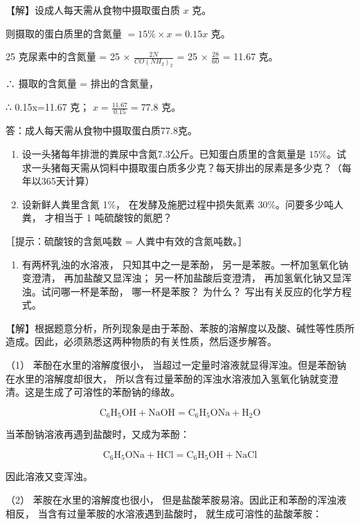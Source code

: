 【解】设成人每天需从食物中摄取蛋白质 \(x\) 克。

则摄取的蛋白质里的含氮量 \(= 15\% \times x = 0.15x\) 克。

25 克尿素中的含氮量 = 25 × \(\frac{2N}{CO(NH_{2})_{2}}\) = 25 ×
\(\frac{28}{60}\) = 11.67 克。

∴ 摄取的含氮量 = 排出的含氮量，

∴ 0.15x=11.67 克； \(x=\frac{11.67}{0.15}=77.8\) 克。

答：成人每天需从食物中摄取蛋白质77.8克。

\begin{enumerate}[start=5]
\item
  设一头猪每年排泄的粪尿中含氮7.3公斤。已知蛋白质里的含氮量是
  \(15\%\)。试求一头猪每天需从饲料中摄取蛋白质多少克？每天排出的尿素是多少克？（每年以365天计算）
\item
  设新鲜人粪里含氮 1\%， 在发酵及施肥过程中损失氮素
  30\%。问要多少吨人粪， 才相当于 1 吨硫酸铵的氮肥？
\end{enumerate}

［提示：硫酸铵的含氮吨数 = 人粪中有效的含氮吨数。］

\begin{enumerate}[start=7]
\item
  有两杯乳浊的水溶液， 只知其中之一是苯酚，
  另一是苯胺。一杯加氢氧化钠变澄清， 再加盐酸又显浑浊；
  另一杯加盐酸后变澄清， 再加氢氧化钠又显浑浊。试问哪一杯是苯酚，
  哪一杯是苯胺？ 为什么？ 写出有关反应的化学方程式。
\end{enumerate}

【解】根据题意分析，所列现象是由于苯酚、苯胺的溶解度以及酸、碱性等性质所造成。因此，必须熟悉这两种物质的有关性质，然后逐步解答。

（1） 苯酚在水里的溶解度很小，
当超过一定量时溶液就显得浑浊。但是苯酚钠在水里的溶解度却很大，
所以含有过量苯酚的浑浊水溶液加入氢氧化钠就变澄清。这是生成了可溶性的苯酚钠的缘故。

\[
\mathrm{C} _ {6} \mathrm{H} _ {5} \mathrm{OH} + \mathrm{NaOH} = \mathrm{C} _ {6} \mathrm{H} _ {5} \mathrm{ONa} + \mathrm{H} _ {2} \mathrm{O}
\]

当苯酚钠溶液再遇到盐酸时，又成为苯酚：

\[
\mathrm{C} _ {6} \mathrm{H} _ {5} \mathrm{ONa} + \mathrm{HCl} = \mathrm{C} _ {6} \mathrm{H} _ {5} \mathrm{OH} + \mathrm{NaCl}
\]

因此溶液又变浑浊。

（2） 苯胺在水里的溶解度也很小，
但是盐酸苯胺易溶。因此正和苯酚的浑浊液相反，
当含有过量苯胺的水溶液遇到盐酸时， 就生成可溶性的盐酸苯胺：

